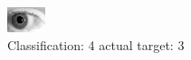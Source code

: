 \begin{figure}[h!]
\begin{center}
\includegraphics[width=0.60\columnwidth]{figures/ID328_class_4_target_3.png}
\end{center}
\caption{ Classification: 4 actual target: 3}
\label{fig:ID328_class_4_target_3}
\end{figure}

